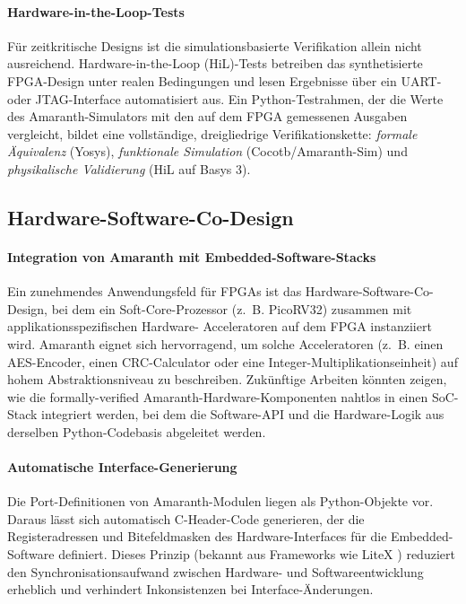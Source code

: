 ﻿\documentclass[12pt,a4paper]{report}
\begin{document}
\paragraph{Hardware-in-the-Loop-Tests}
Für zeitkritische Designs ist die simulationsbasierte Verifikation allein nicht
ausreichend. Hardware-in-the-Loop (HiL)-Tests betreiben das synthetisierte FPGA-Design
unter realen Bedingungen und lesen Ergebnisse über ein UART- oder JTAG-Interface
automatisiert aus. Ein Python-Testrahmen, der die Werte des Amaranth-Simulators mit
den auf dem FPGA gemessenen Ausgaben vergleicht, bildet eine vollständige, dreigliedrige
Verifikationskette: \textit{formale Äquivalenz} (Yosys), \textit{funktionale Simulation}
(Cocotb/Amaranth-Sim) und \textit{physikalische Validierung} (HiL auf Basys 3).

\subsection{Hardware-Software-Co-Design}

\paragraph{Integration von Amaranth mit Embedded-Software-Stacks}
Ein zunehmendes Anwendungsfeld für FPGAs ist das Hardware-Software-Co-Design, bei dem ein
Soft-Core-Prozessor (z.~B. PicoRV32) zusammen mit applikationsspezifischen Hardware-
Acceleratoren auf dem FPGA instanziiert wird. Amaranth eignet sich hervorragend, um
solche Acceleratoren (z.~B. einen AES-Encoder, einen CRC-Calculator oder eine
Integer-Multiplikationseinheit) auf hohem Abstraktionsniveau zu beschreiben. Zukünftige
Arbeiten könnten zeigen, wie die formally-verified Amaranth-Hardware-Komponenten nahtlos
in einen SoC-Stack integriert werden, bei dem die Software-API und die Hardware-Logik
aus derselben Python-Codebasis abgeleitet werden.

\paragraph{Automatische Interface-Generierung}
Die Port-Definitionen von Amaranth-Modulen liegen als Python-Objekte vor. Daraus lässt
sich automatisch C-Header-Code generieren, der die Registeradressen und Bitefeldmasken
des Hardware-Interfaces für die Embedded-Software definiert. Dieses Prinzip (bekannt aus
Frameworks wie LiteX \cite{litex2024}) reduziert den Synchronisationsaufwand zwischen
Hardware- und Softwareentwicklung erheblich und verhindert Inkonsistenzen bei
Interface-Änderungen.
\end{document}
